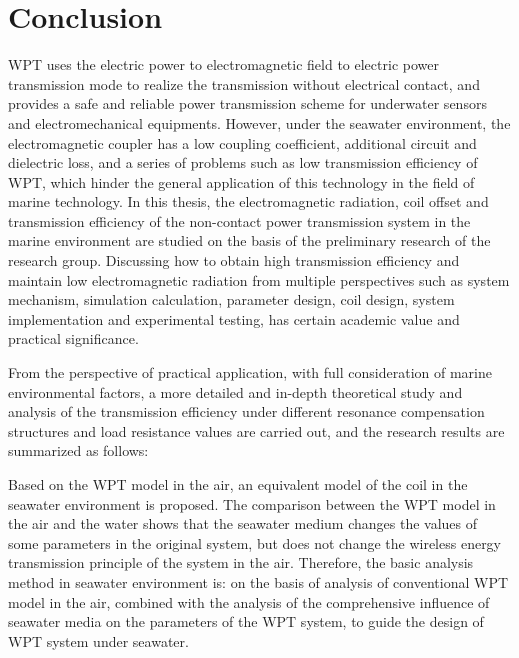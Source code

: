 \chapter{Conclusion}


WPT uses the electric power to electromagnetic field to electric power transmission mode to realize the transmission without electrical contact, and provides a safe and reliable power transmission scheme for underwater sensors and electromechanical equipments. 
However, under the seawater environment, the electromagnetic coupler has a low coupling coefficient, additional circuit and dielectric loss, and a series of problems such as low transmission efficiency of WPT, which hinder the general application of this technology in the field of marine technology. 
In this thesis, the electromagnetic radiation, coil offset and transmission efficiency of the non-contact power transmission system in the marine environment are studied on the basis of the preliminary research of the research group. Discussing how to obtain high transmission efficiency and maintain low electromagnetic radiation from multiple perspectives such as system mechanism, simulation calculation, parameter design, coil design, system implementation and experimental testing, has certain academic value and practical significance.

From the perspective of practical application, with full consideration of marine environmental factors, a more detailed and in-depth theoretical study and analysis of the transmission efficiency under different resonance compensation structures and load resistance values are carried out, and the research results are summarized as follows:

Based on the WPT model in the air, an equivalent model of the coil in the seawater environment is proposed.
The comparison between the WPT model in the air and the water shows that the seawater medium changes the values of some parameters in the original system, but does not change the wireless energy transmission principle of the system in the air.
Therefore, the basic analysis method in seawater environment is: on the basis of analysis of conventional WPT model in the air, combined with the analysis of the comprehensive influence of seawater media on the parameters of the WPT system, to guide the design of WPT system under seawater.

